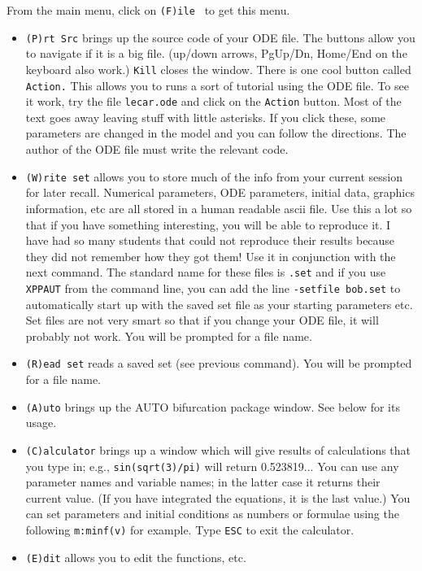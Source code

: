 \documentclass{article}
\begin{document}
\bigskip
{}
From the main menu, click on {\tt (F)ile } to get this menu. 
\begin{itemize}
\item {\tt (P)rt Src} brings up the source code of your ODE file. The buttons allow you to navigate if it is a big file. (up/down arrows, PgUp/Dn, Home/End on the keyboard also work.) {\tt Kill} closes the window. There is one cool button called {\tt Action.} This allows you to runs a sort of tutorial using the ODE file. To see it work, try the file {\tt lecar.ode} and click on the {\tt Action} button. Most of the text goes away leaving stuff with little asterisks. If you click these, some parameters are changed in the model and you can follow the directions. The author of the ODE file must write the relevant code. 
\item {\tt (W)rite set} allows you to store much of the info from your current session for later recall. Numerical parameters, ODE parameters, initial data, graphics information, etc are all stored in a human readable ascii file. Use this a lot so that if you have something interesting, you will be able to reproduce it. I have had so many students that could not reproduce their results because they did not remember how they got them! Use it in conjunction with the next command. The standard name for these files is {\tt *.set} and if you use {\tt XPPAUT} from the command line, you can add the line {\tt -setfile bob.set} to automatically start up with the saved set file as your starting parameters etc. Set files are not very smart so that if you change your ODE file, it will probably not work. You will be prompted for a file name.
\item {\tt (R)ead set} reads a saved set (see previous command). You will be prompted for a file name.
\item {\tt (A)uto} brings up the AUTO bifurcation package window. See below for its usage.
\item {\tt (C)alculator} brings up a window which will give results of calculations that you type in; e.g., {\tt sin(sqrt(3)/pi)} will return 0.523819...  You can use any parameter names and variable names; in the latter case it returns their current value. (If you have integrated the equations, it is the last value.) You can set parameters and initial conditions as numbers or formulae using the following {\tt m:minf(v)} for example.  Type {\tt ESC} to exit the calculator.
\item {\tt (E)dit} allows you to edit the functions, etc.

\end{itemize}
\end{document}
